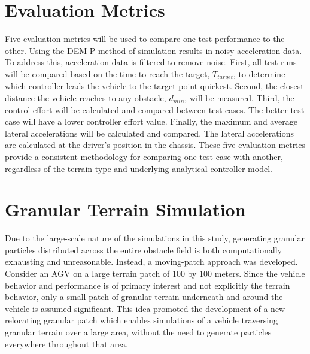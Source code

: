 \documentclass[12pt,onecolumn]{report}
\begin{document}

\section{Evaluation Metrics}\label{s:Metrics}
Five evaluation metrics will be used to compare one test performance to the other. Using the DEM-P method of simulation results in noisy acceleration data. To address this, acceleration data is filtered to remove noise. First, all test runs will be compared based on the time to reach the target, $T_{target}$, to determine which controller leads the vehicle to the target point quickest. Second, the closest distance the vehicle reaches to any obstacle, $d_{min}$, will be measured. Third, the control effort will be calculated and compared between test cases. The better test case will have a lower controller effort value. Finally, the maximum and average lateral accelerations will be calculated and compared. The lateral accelerations are calculated at the driver's position in the chassis. These five evaluation metrics provide a consistent methodology for comparing one test case with another, regardless of the terrain type and underlying analytical controller model.


\section{Granular Terrain Simulation}\label{s:GranSim}

Due to the large-scale nature of the simulations in this study, generating granular particles distributed across the entire obstacle field is both computationally exhausting and unreasonable. Instead, a moving-patch approach was developed. Consider an AGV on a large terrain patch of $100$ by $100$ meters. Since the vehicle behavior and performance is of primary interest and not explicitly the terrain behavior, only a small patch of granular terrain underneath and around the vehicle is assumed significant. This idea promoted the development of a new relocating granular patch which enables simulations of a vehicle traversing granular terrain over a large area, without the need to generate particles everywhere throughout that area. 
\end{document}
